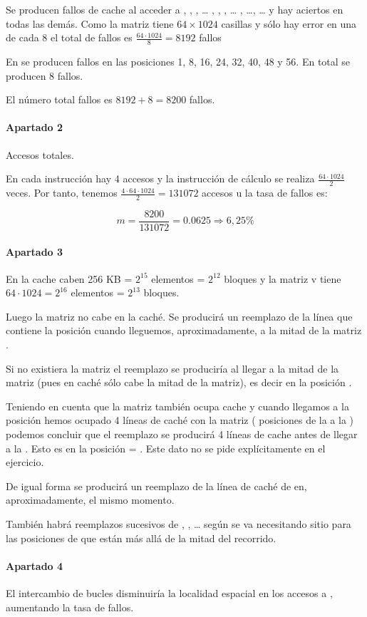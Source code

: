 Se  producen fallos de cache al acceder a 
, , , \ldots 
{}, , , \ldots
\cppid{[2,0]}, \ldots {}, \ldots 
y hay aciertos en todas las demás. Como la matriz tiene $64 \times 1024$
casillas y sólo hay error en una de cada 8 el total de fallos es  $\frac{64
\cdot 1024}{8}= 8192$ fallos 

En  se producen fallos en las posiciones 1, 8, 16, 24, 32, 40, 48 y 56.
En total se producen 8 fallos. 

El número total fallos es $8192 + 8 = 8200$ fallos.

\paragraph{Apartado 2}

Accesos totales.

En cada instrucción hay 4 accesos y la instrucción de cálculo se realiza
$\frac{64 \cdot 1024}{2}$ veces. Por tanto, tenemos $\frac{4 \cdot 64 \cdot 1024}{2} = 131072$ accesos u la tasa de fallos es:

\[
m = \frac{8200}{131072} = 0.0625 \Rightarrow 6,25 \%
\] 

\paragraph{Apartado 3}

En la cache caben 256 KB = $2^{15}$ elementos = $2^{12}$ bloques y
la matriz v tiene $64 \cdot 1024 = 2^{16}$ elementos = $2^{13}$ bloques.

Luego la matriz   no cabe en la caché. 
Se producirá un reemplazo de la línea que contiene la posición 
cuando lleguemos, aproximadamente, a la mitad de la matriz .

Si no existiera la matriz  el reemplazo se produciría al llegar a la mitad de
la matriz (pues en caché sólo cabe la mitad de la matriz), es decir en la
posición .

Teniendo en cuenta que la matriz  también ocupa cache y cuando
llegamos a la posición  hemos ocupado 4 líneas de caché con la
matriz  ( posiciones de la  a la ) podemos concluir que el reemplazo
se producirá 4 líneas de cache antes de llegar a la . Esto es en la
posición  = . 
Este dato no se pide explícitamente en el ejercicio. 

De igual forma se producirá un reemplazo de la línea de caché de  en,
aproximadamente, el mismo momento. 

También habrá reemplazos sucesivos de , , \ldots
según se va necesitando sitio para las posiciones de  que están más allá de la
mitad del recorrido.

\paragraph{Apartado 4}

El intercambio de bucles disminuiría la localidad espacial en los accesos a
, aumentando la tasa de fallos.
